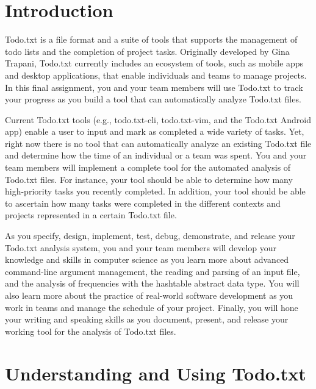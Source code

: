 


\usepackage[compact]{titlesec}


\section*{Introduction}

Todo.txt is a file format and a suite of tools that supports the management of todo lists and the completion of project
tasks. Originally developed by Gina Trapani, Todo.txt currently includes an ecosystem of tools, such as mobile apps and
desktop applications, that enable individuals and teams to manage projects. In this final assignment, you and your team
members will use Todo.txt to track your progress as you build a tool that can automatically analyze Todo.txt files.

Current Todo.txt tools (e.g., todo.txt-cli, todo.txt-vim, and the Todo.txt Android app) enable a user to input and mark
as completed a wide variety of tasks.  Yet, right now there is no tool that can automatically analyze an existing
Todo.txt file and determine how the time of an individual or a team was spent. You and your team members will implement
a complete tool for the automated analysis of Todo.txt files.  For instance, your tool should be able to determine how
many high-priority tasks you recently completed.  In addition, your tool should be able to ascertain how many tasks were
completed in the different contexts and projects represented in a certain Todo.txt file. 

As you specify, design, implement, test, debug, demonstrate, and release your Todo.txt analysis system, you and your
team members will develop your knowledge and skills in computer science as you learn more about advanced command-line
argument management, the reading and parsing of an input file, and the analysis of frequencies with the hashtable
abstract data type. You will also learn more about the practice of real-world software development as you work in teams
and manage the schedule of your project. Finally, you will hone your writing and speaking skills as you document,
present, and release your working tool for the analysis of Todo.txt files.

\section*{Understanding and Using Todo.txt}

